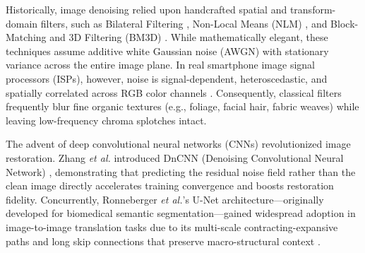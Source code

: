 \documentclass{ieeeaccess}
\begin{document}
Historically, image denoising relied upon handcrafted spatial and transform-domain filters, such as Bilateral Filtering \cite{tomasi1998bilateral}, Non-Local Means (NLM) \cite{buades2005non}, and Block-Matching and 3D Filtering (BM3D) \cite{dabov2007image}. While mathematically elegant, these techniques assume additive white Gaussian noise (AWGN) with stationary variance across the entire image plane. In real smartphone image signal processors (ISPs), however, noise is signal-dependent, heteroscedastic, and spatially correlated across RGB color channels \cite{foi2008practical}. Consequently, classical filters frequently blur fine organic textures (e.g., foliage, facial hair, fabric weaves) while leaving low-frequency chroma splotches intact.

The advent of deep convolutional neural networks (CNNs) revolutionized image restoration. Zhang \textit{et al.} introduced DnCNN (Denoising Convolutional Neural Network) \cite{zhang2017beyond}, demonstrating that predicting the residual noise field rather than the clean image directly accelerates training convergence and boosts restoration fidelity. Concurrently, Ronneberger \textit{et al.}'s U-Net \cite{ronneberger2015u} architecture---originally developed for biomedical semantic segmentation---gained widespread adoption in image-to-image translation tasks due to its multi-scale contracting-expansive paths and long skip connections that preserve macro-structural context \cite{isola2017image}.
\end{document}
